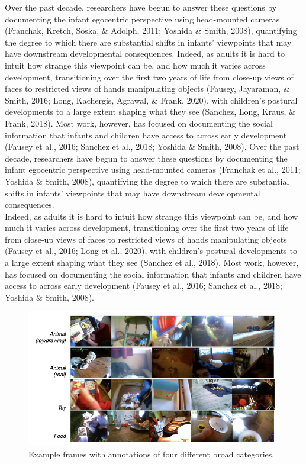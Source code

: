 \documentclass[10pt, letterpaper]{article}
\newenvironment{CodeChunk}{}{}
\begin{document}
Over the past decade, researchers have begun to answer these questions
by documenting the infant egocentric perspective using head-mounted
cameras (Franchak, Kretch, Soska, \& Adolph, 2011; Yoshida \& Smith,
2008), quantifying the degree to which there are substantial shifts in
infants' viewpoints that may have downstream developmental consequences.
Indeed, as adults it is hard to intuit how strange this viewpoint can
be, and how much it varies across development, transitioning over the
first two years of life from close-up views of faces to restricted views
of hands manipulating objects (Fausey, Jayaraman, \& Smith, 2016; Long,
Kachergis, Agrawal, \& Frank, 2020), with children's postural
developments to a large extent shaping what they see (Sanchez, Long,
Kraus, \& Frank, 2018). Most work, however, has focused on documenting
the social information that infants and children have access to across
early development (Fausey et al., 2016; Sanchez et al., 2018; Yoshida \&
Smith, 2008). Over the past decade, researchers have begun to answer
these questions by documenting the infant egocentric perspective using
head-mounted cameras (Franchak et al., 2011; Yoshida \& Smith, 2008),
quantifying the degree to which there are substantial shifts in infants'
viewpoints that may have downstream developmental consequences.\\
Indeed, as adults it is hard to intuit how strange this viewpoint can
be, and how much it varies across development, transitioning over the
first two years of life from close-up views of faces to restricted views
of hands manipulating objects (Fausey et al., 2016; Long et al., 2020),
with children's postural developments to a large extent shaping what
they see (Sanchez et al., 2018). Most work, however, has focused on
documenting the social information that infants and children have access
to across early development (Fausey et al., 2016; Sanchez et al., 2018;
Yoshida \& Smith, 2008).

\begin{CodeChunk}
\begin{figure}[h]

{\centering \includegraphics{figs/examples-1} 

}

\caption[Example frames with annotations of four different broad categories]{Example frames with annotations of four different broad categories.}\label{fig:examples}
\end{figure}
\end{CodeChunk}
\end{document}
